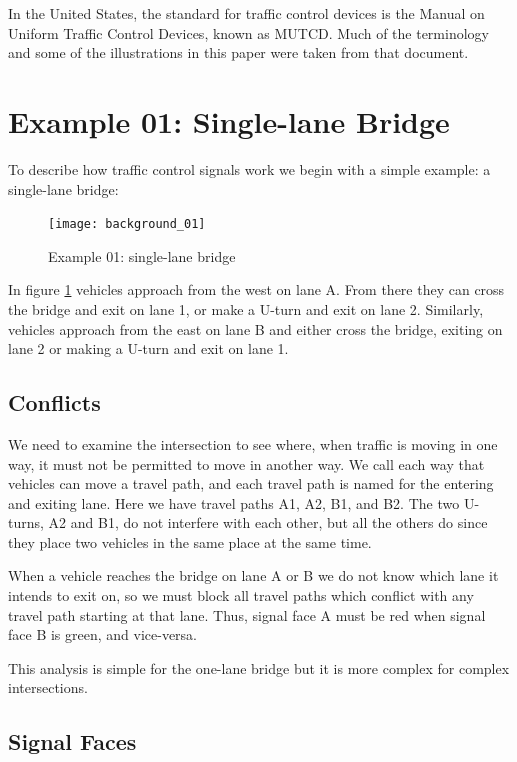 \documentclass[letterpaper,twoside]{article}
\begin{document}
In the United States, the standard for traffic control devices is the
Manual on Uniform Traffic Control Devices, known as MUTCD\citep{MUTCD11}.
Much of the terminology and some of the illustrations
in this paper were taken from that document.

\section{Example 01: Single-lane Bridge}

To describe how traffic control signals work we begin with a simple
example: a single-lane bridge:

\begin{figure}[htb]
  {\texttt{[image: background\_01]}}
  {\caption{Example 01: single-lane bridge}\label{fig:single-lane_bridge}}
\end{figure}

In figure \ref{fig:single-lane_bridge} vehicles approach from the west
on lane A.  From there they can cross the bridge and exit on lane 1,
or make a U-turn and exit on lane 2.  Similarly, vehicles approach
from the east on lane B and either cross the bridge, exiting on lane 2
or making a U-turn and exit on lane 1.

\subsection{Conflicts}

We need to examine the intersection to see where, when traffic is moving
in one way, it must not be permitted to move in another way.  We call each
way that vehicles can move a travel path, and each travel path is named
for the entering and exiting lane.  Here we have travel paths A1, A2, B1,
and B2.  The two U-turns, A2 and B1, do not interfere with each other, but
all the others do since they place two vehicles in the same place at the
same time.

When a vehicle reaches the bridge on lane A or B we do not
know which lane it intends to exit on, so we must block all travel paths
which conflict with any travel path starting at that lane.  Thus,
signal face A must be red when signal face B is green, and vice-versa.

This analysis is simple for the one-lane bridge but it is more complex
for complex intersections.

\subsection{Signal Faces}
\end{document}
